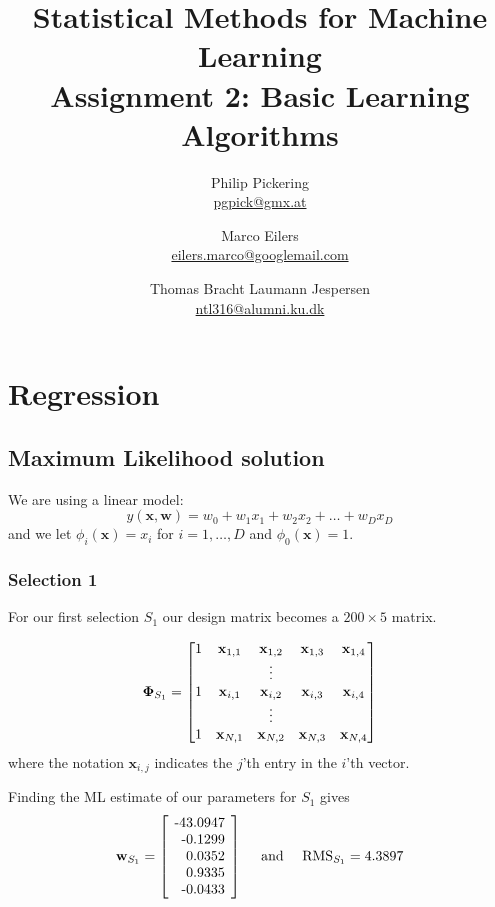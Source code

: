 \documentclass{article}
\author{Philip Pickering\\ \url{pgpick@gmx.at} \and Marco Eilers\\ \url{eilers.marco@googlemail.com} \and Thomas Bracht Laumann Jespersen\\ \url{ntl316@alumni.ku.dk}}
\title{Statistical Methods for Machine Learning\\ Assignment 2: Basic Learning Algorithms}
\date{}
\newcommand{\vect}[1]{\ensuremath{\boldsymbol{\mathbf{#1}}}\xspace}
\begin{document}
\maketitle

\section{Regression}

\subsection{Maximum Likelihood solution}

We are using a linear model:
\[
y(\vect{x},\vect{w}) = w_0 + w_1 x_1 + w_2 x_2 + \dots + w_D x_D
\]
and we let $\phi_i(\vect{x}) = x_i$ for $i = 1,\dots,D$ and
$\phi_0(\vect{x}) = 1$.

\subsubsection{Selection 1}

For our first selection $S_1$ our design matrix becomes a $200\times
5$ matrix.

\[
\vect{\Phi}_{S_1} = \begin{bmatrix}1 & \vect{x}_{1,1} & \vect{x}_{1,2} & \vect{x}_{1,3} & \vect{x}_{1,4}\\
\hfill & \hfill & \vdots & \hfill & \hfill\\
1 & \vect{x}_{i,1} & \vect{x}_{i,2} & \vect{x}_{i,3} & \vect{x}_{i,4}\\
\hfill & \hfill & \vdots & \hfill & \hfill\\
1 & \vect{x}_{N,1} & \vect{x}_{N,2} & \vect{x}_{N,3} & \vect{x}_{N,4}\\
\end{bmatrix}
\]
where the notation $\vect{x}_{i,j}$ indicates the $j$'th entry in the
$i$'th vector. %

Finding the ML estimate of our parameters for $S_1$ gives
\[
\vect{w}_{S_1} = \left[\!\begin{tabular}{r@{.}l} -43 & 0947\\ -0 &
  1299\\ 0 & 0352\\ 0 & 9335\\ -0 &
  0433\end{tabular}\!\right]\quad\text{ and }\quad \mathrm{RMS}_{S_1} = 4.3897
\]
\end{document}
